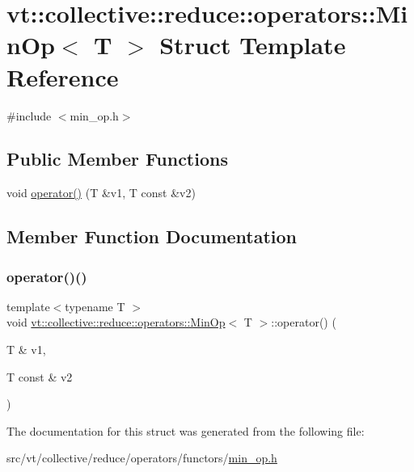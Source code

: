 \hypertarget{structvt_1_1collective_1_1reduce_1_1operators_1_1_min_op}{}\section{vt\+:\+:collective\+:\+:reduce\+:\+:operators\+:\+:Min\+Op$<$ T $>$ Struct Template Reference}
\label{structvt_1_1collective_1_1reduce_1_1operators_1_1_min_op}


{\ttfamily \#include $<$min\+\_\+op.\+h$>$}

\subsection*{Public Member Functions}
\begin{DoxyCompactItemize}
\item 
void \hyperlink{structvt_1_1collective_1_1reduce_1_1operators_1_1_min_op_a19d2f7cf4443406bdf6ba593e7e23eba}{operator()} (T \&v1, T const \&v2)
\end{DoxyCompactItemize}


\subsection{Member Function Documentation}
\mbox{\label{structvt_1_1collective_1_1reduce_1_1operators_1_1_min_op_a19d2f7cf4443406bdf6ba593e7e23eba}} 
\subsubsection{\texorpdfstring{operator()()}{operator()()}}
{\footnotesize\ttfamily template$<$typename T $>$ \\
void \hyperlink{structvt_1_1collective_1_1reduce_1_1operators_1_1_min_op}{vt\+::collective\+::reduce\+::operators\+::\+Min\+Op}$<$ T $>$\+::operator() (\begin{DoxyParamCaption}\item[{T \&}]{v1,  }\item[{T const \&}]{v2 }\end{DoxyParamCaption})\hspace{0.3cm}{\ttfamily [inline]}}



The documentation for this struct was generated from the following file\+:\begin{DoxyCompactItemize}
\item 
src/vt/collective/reduce/operators/functors/\hyperlink{min__op_8h}{min\+\_\+op.\+h}\end{DoxyCompactItemize}
